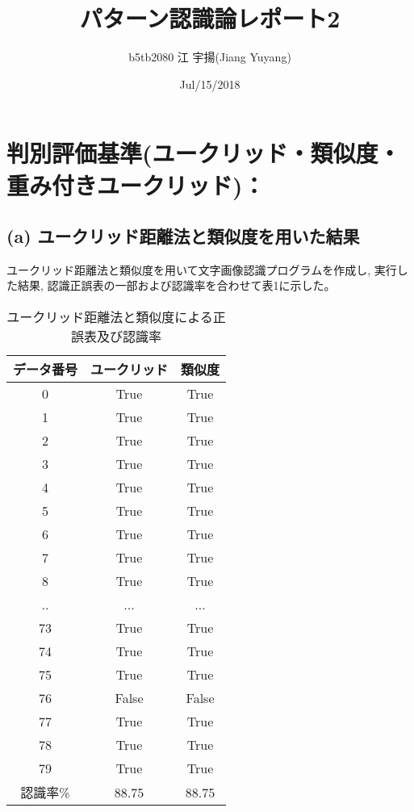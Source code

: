 \documentclass[twocolumn, 10.5pt]{jsarticle}
\title{パターン認識論レポート2}
\date{Jul/15/2018}
\author{b5tb2080 江 宇揚(Jiang Yuyang)}
\begin{document}

\section{判別評価基準(ユークリッド・類似度・重み付きユークリッド)：}
\subsection{(a) ユークリッド距離法と類似度を用いた結果}
ユークリッド距離法と類似度を用いて文字画像認識プログラムを作成し, 実行した結果, 認識正誤表の一部および認識率を合わせて表1に示した。
\begin{table}[hbtp]
  \caption{ユークリッド距離法と類似度による正誤表及び認識率}
  \centering
  \begin{tabular}{|c||c|c|}\hline
  データ番号 & ユークリッド & 類似度 \\\hline\hline
    0 & True & True \\\hline
    1 & True & True \\\hline
    2 & True & True \\\hline
    3 & True & True \\\hline
    4 & True & True \\\hline
    5 & True & True \\\hline
    6 & True & True \\\hline
    7 & True & True \\\hline
    8 & True & True \\\hline
    .. & ... & ... \\\hline
    73 & True & True \\\hline
    74 & True & True \\\hline
    75 & True & True \\\hline
    76 & False & False \\\hline
    77 & True & True \\\hline
    78 & True & True \\\hline
    79 & True & True \\\hline\hline
    認識率\% & 88.75 & 88.75 \\\hline
  \end{tabular}
\end{table}
\end{document}
